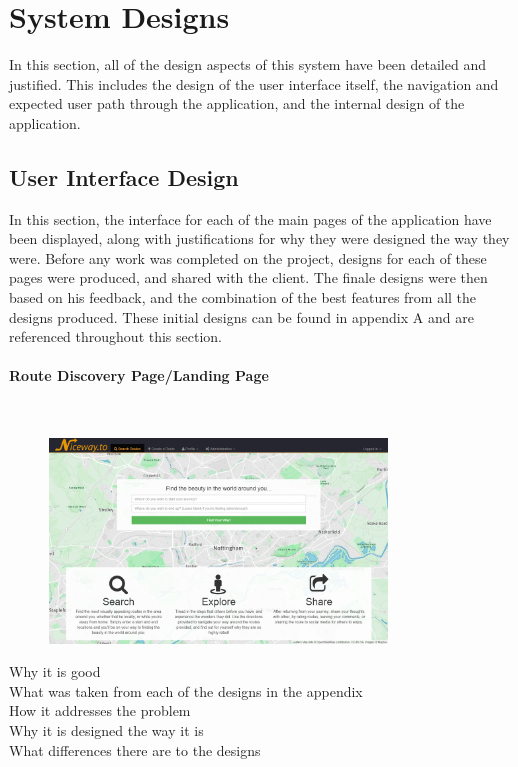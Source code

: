 \section{System Designs}
In this section, all of the design aspects of this system have been detailed and justified. This includes the design of the user interface itself, the navigation and expected user path through the application, and the internal design of the application.

\subsection{User Interface Design}
In this section, the interface for each of the main pages of the application have been displayed, along with justifications for why they were designed the way they were. Before any work was completed on the project, designs for each of these pages were produced, and shared with the client. The finale designs were then based on his feedback, and the combination of the best features from all the designs produced. These initial designs can be found in {\color{red} appendix A} and are referenced throughout this section.

\paragraph{Route Discovery Page/Landing Page}\ \\
\begin{figure}[!ht]
	\vspace{-5mm}
	\begin{center}
		\includegraphics[width=0.8\textwidth]{images/design/landing.png}
	\end{center}
	\vspace{-5mm}
\end{figure}

{\color{red}
\noindent 
Why it is good\ \\
What was taken from each of the designs in the appendix\ \\
How it addresses the problem \ \\
Why it is designed the way it is\ \\
What differences there are to the designs
}

